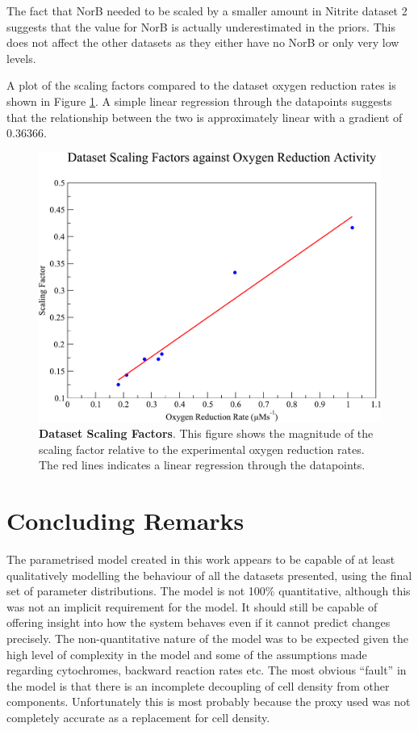 The fact that NorB needed to be scaled by a smaller amount in Nitrite dataset 2 suggests that the value for NorB is actually underestimated in the priors. This does not affect the other datasets as they either have no NorB or only very low levels.

A plot of the scaling factors compared to the dataset oxygen reduction rates is shown in Figure \ref{fig:scaling-factors}. A simple linear regression through the datapoints suggests that the relationship between the two is approximately linear with a gradient of $0.36366$.

\begin{figure}[tbp]
 \centering
 \includegraphics[width=15cm, clip=true]{./09-completedmodel/data/scaling.pdf}
 \caption[Dataset Scaling Factors]{{\bf Dataset Scaling Factors}. This figure shows the magnitude of the scaling factor relative to the experimental oxygen reduction rates. The red lines indicates a linear regression through the datapoints.
 \label{fig:scaling-factors}}
\end{figure}

\section{Concluding Remarks}
The parametrised model created in this work appears to be capable of at least qualitatively modelling the behaviour of all the datasets presented, using the final set of parameter distributions. The model is not 100\% quantitative, although this was not an implicit requirement for the model. It should still be capable of offering insight into how the system behaves even if it cannot predict changes precisely. The non-quantitative nature of the model was to be expected given the high level of complexity in the model and some of the assumptions made regarding cytochromes, backward reaction rates etc. The most obvious ``fault'' in the model is that there is an incomplete decoupling of cell density from other components. Unfortunately this is most probably because the proxy used was not completely accurate as a replacement for cell density.

